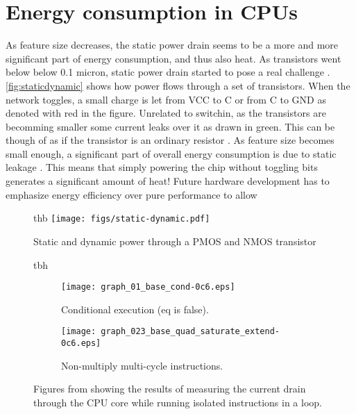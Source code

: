 \section{Energy consumption in CPUs}


As feature size decreases, the static power drain
seems to be a more and more significant part of energy consumption, and thus
also heat. As transistors went below below 0.1 micron, static power drain
started to pose a real challenge \cite{kim2003leakage,martin2002combined}.
\autoref{fig:staticdynamic} shows how power flows through a set of transistors.
When the network toggles, a small charge is let from VCC to C or from C to GND
as denoted with red in the figure.  Unrelated to switchin, as the transistors
are becomming smaller some current leaks over it as drawn in green. This can be
though of as if the transistor is an ordinary resistor \cite{wolf}. As feature
size becomes small enough, a significant part of overall energy consumption is
due to static leakage \cite{nguyen2003minimization}. This means that simply
powering the chip without toggling bits generates a significant amount of heat!
Future hardware development has to emphasize energy efficiency over pure
performance to allow 


\begin{figure}{thb}
    \centering
    \texttt{[image: figs/static-dynamic.pdf]}
    \caption{Static and dynamic power through a PMOS and NMOS transistor}
    \label{fig:staticdynamic}
\end{figure}

\begin{figure}{tbh}
    \begin{subfigure}[b]{0.48\textwidth}
        \texttt{[image: graph\_01\_base\_cond-0c6.eps]}
        \caption{Conditional execution (eq is false).}
        \label{fig:consumptioncond}
    \end{subfigure}
    \begin{subfigure}[b]{0.52\textwidth}
        \texttt{[image: graph\_023\_base\_quad\_saturate\_extend-0c6.eps]}
        \caption{Non-multiply multi-cycle instructions.}
        \label{fig:consumptionmulti}
    \end{subfigure}
    \caption{Figures from \cite{rundehvatum2013exploring} showing the results of measuring the
    current drain through the CPU core while running isolated instructions in a loop.}
    \label{fig:consumption}
\end{figure}



